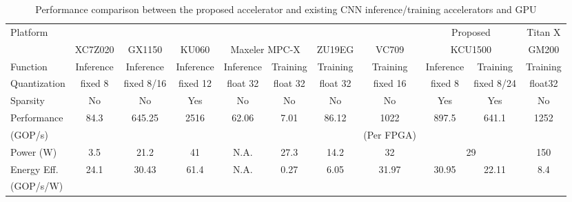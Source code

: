 \begin{table*}[htbp]
    \centering
    \caption{Performance comparison between the proposed accelerator and existing CNN inference/training accelerators and GPU}
      \begin{tabular}{|l|c|c|c|c|c|c|c|c|c|c|}
      \hline
      \multirow{2}[4]{*}{Platform} & \cite{guo2017angel} & \cite{ma2017optimizing} & \cite{han2017ese} & \multicolumn{2}{c|}{\cite{zhao2016f}} & \cite{liu2017fpga} & \cite{geng2018fpdeep} & \multicolumn{2}{c|}{Proposed} & Titan X \\
  \cline{2-10}          & \multicolumn{1}{l|}{XC7Z020} & GX1150 & KU060 & \multicolumn{2}{c|}{Maxeler MPC-X} & ZU19EG & VC709 & \multicolumn{2}{c|}{KCU1500} &  GM200 \\
      \hline
      Function & Inference & Inference & Inference & Inference & Training & Training & Training & Inference & Training & Training \\
      \hline
      Quantization & fixed 8 & fixed 8/16 & fixed 12 & float 32 & float 32 & float 32 & fixed 16 & fixed 8 & fixed 8/24 & float32 \\
      \hline
      Sparsity & No    & No    & Yes   & No    & No    & No    & No    & Yes   & Yes   & No \\
      \hline
      Performance & \multirow{2}[2]{*}{84.3} & \multirow{2}[2]{*}{645.25} & \multirow{2}[2]{*}{2516} & \multirow{2}[2]{*}{62.06} & \multirow{2}[2]{*}{7.01} & \multirow{2}[2]{*}{86.12} & 1022  & \multirow{2}[2]{*}{897.5} & \multirow{2}[2]{*}{641.1} & \multirow{2}[2]{*}{1252} \\
      (GOP/s) &       &       &       &       &       &       & (Per FPGA) &       &       &  \\
      \hline
      Power (W) & 3.5   & 21.2  & 41    & N.A.  & 27.3  & 14.2  & 32    & \multicolumn{2}{c|}{29} & 150 \\
      \hline
      Energy Eff. & \multirow{2}[2]{*}{24.1} & \multirow{2}[2]{*}{30.43} & \multirow{2}[2]{*}{61.4} & \multirow{2}[2]{*}{N.A.} & \multirow{2}[2]{*}{0.27} & \multirow{2}[2]{*}{6.05} & \multirow{2}[2]{*}{31.97} & \multirow{2}[2]{*}{30.95} & \multirow{2}[2]{*}{22.11} & \multirow{2}[2]{*}{8.4} \\
      (GOP/s/W) &       &       &       &       &       &       &       &       &       &  \\
      \hline
      \end{tabular}%
    \label{tab:perf_compare}%
\end{table*}%